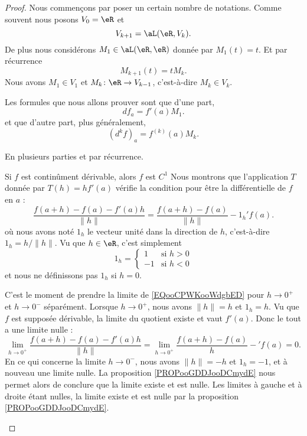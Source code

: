 \begin{proof}
    Nous commençons par poser un certain nombre de notations. Comme souvent nous posons \( V_0=\eR\) et
    \begin{equation}
        V_{k+1}=\aL(\eR,V_k).
    \end{equation}
    De plus nous considérons \( M_1\in \aL(\eR,\eR)\) donnée par \( M_1(t)=t\). Et par récurrence
    \begin{equation}
        M_{k+1}(t)=tM_{k}.
    \end{equation}
    Nous avons \( M_1\in V_1\) et \( M_k\colon \eR\to V_{k-1}\), c'est-à-dire \( M_k\in V_k\).

    Les formules que nous allons prouver sont que d'une part,
    \begin{equation}
        df_a=f'(a)M_1.
    \end{equation}
    et que d'autre part, plus généralement,
    \begin{equation}
        (d^kf)_a=f^{(k)}(a)M_k.
    \end{equation}

    En plusieurs parties et par récurrence.
    \begin{subproof}
    \item[Si \( f\) est continûment dérivable, alors \( f\) est \( C^1\) ]
        Nous montrons que l'application \( T\) donnée par \( T(h)=hf'(a)\) vérifie la condition pour être la différentielle de \( f\) en \( a\) :
        \begin{equation}        \label{EQooCPWKooWdgbED}
            \frac{ f(a+h)-f(a)-f'(a)h }{ \| h \| }=\frac{ f(a+h)-f(a) }{ \| h \| }-1_h'f(a).
        \end{equation}
        où nous avons noté \( 1_h\) le vecteur unité dans la direction de \( h\), c'est-à-dire \( 1_h=h/\| h \|\). Vu que \( h\in \eR\), c'est simplement
        \begin{equation}
            1_h=\begin{cases}
                1    &   \text{si } h>0\\
                -1    &    \text{si }h<0
            \end{cases}
        \end{equation}
        et nous ne définissons pas \( 1_h\) si \( h=0\).
        
        C'est le moment de prendre la limite de \eqref{EQooCPWKooWdgbED} pour \( h\to 0^+\) et \( h\to 0^-\) séparément. Lorsque \( h\to 0^+\), nous avons \( \| h \|=h\) et \( 1_h=h\). Vu que \( f\) est supposée dérivable, la limite du quotient existe et vaut \( f'(a)\). Donc le tout a une limite nulle :
        \begin{equation}       
            \lim_{h\to 0^+} \frac{ f(a+h)-f(a)-f'(a)h }{ \| h \| }=\lim_{h\to 0^+}\frac{ f(a+h)-f(a) }{  h  }-'f(a)=0.
        \end{equation}
        En ce qui concerne la limite \( h\to 0^-\), nous avons \( \| h \|=-h\) et \( 1_h=-1\), et à nouveau une limite nulle. La proposition \ref{PROPooGDDJooDCmydE} nous permet alors de conclure que la limite existe et est nulle. Les limites à gauche et à droite étant nulles, la limite existe et est nulle par la proposition \ref{PROPooGDDJooDCmydE}.


\end{subproof}
\end{proof}
